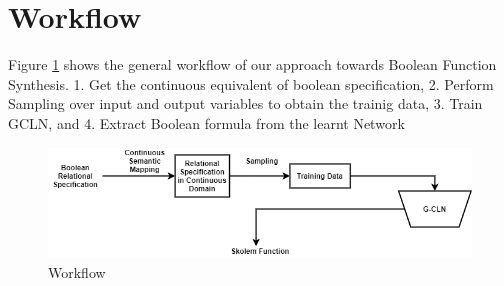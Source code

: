 \section{Workflow}
Figure \ref{fig:workflow} shows the general workflow of our approach towards Boolean Function Synthesis.
1. Get the continuous equivalent of boolean specification, 2. Perform Sampling over input and output variables to obtain the trainig data,
3. Train GCLN, and 4. Extract Boolean formula from the learnt Network

\begin{figure}[t]
	\centering
    \includegraphics[scale=0.5]{workflow_bfs.png}
    \caption{Workflow}
    \label{fig:workflow}
\end{figure}





